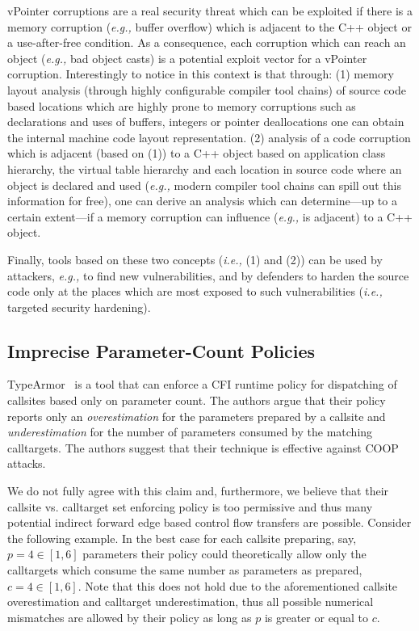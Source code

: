 vPointer corruptions are a real security threat which can be exploited if there is a memory corruption (\textit{e.g.,} buffer overflow) which is adjacent to the C++ object or a use-after-free condition. As a consequence, each corruption which can reach an object (\textit{e.g.,} bad object casts) is a potential exploit vector for a vPointer corruption. Interestingly to notice in this context is that through:
(1) memory layout analysis (through highly configurable compiler tool chains) of source code based locations which are highly prone to memory corruptions such as declarations and uses of buffers, integers or pointer deallocations one can obtain the internal machine code layout representation.
(2) analysis of a code corruption which is adjacent (based on (1)) to a C++ object based on application class hierarchy, the virtual table hierarchy and each location in source code where an object is declared and used (\textit{e.g.,} modern compiler tool chains can spill out this information for free), one can derive an analysis which can determine---up to a certain extent---if a memory corruption can influence (\textit{e.g.,} is adjacent) to a C++ object.

Finally, tools based on these two concepts (\textit{i.e.,} (1) and (2)) can be used by attackers, \textit{e.g.,} to find new vulnerabilities, and by defenders to harden the source code only at the places which are most exposed to such vulnerabilities (\textit{i.e.,} targeted security hardening).

\subsection{Imprecise Parameter-Count Policies}
\label{Too Permissive Parameter-Based Policies}
TypeArmor~\cite{veen:typearmor} is a tool that can enforce a CFI runtime policy for dispatching of callsites based only on
parameter count. The authors argue that their policy reports only an \textit{overestimation} for the parameters prepared by a callsite and \textit{underestimation} for the number of parameters consumed by the matching calltargets. The authors suggest that their technique is effective against COOP attacks. 

We do not fully agree with this claim and, furthermore, we believe that their callsite vs. calltarget set enforcing policy is too permissive and thus many potential indirect forward edge based control flow transfers are possible. Consider the following example. In the best case for each callsite preparing, say, $p=4 \in [1, 6]$ parameters their policy could theoretically allow only the calltargets which consume the same number as parameters as prepared, $c=4 \in [1, 6]$. Note that this does not hold due to 
the aforementioned callsite overestimation and calltarget underestimation, thus all possible numerical mismatches are allowed by their policy as long as $p$ is greater or equal to $c$.

